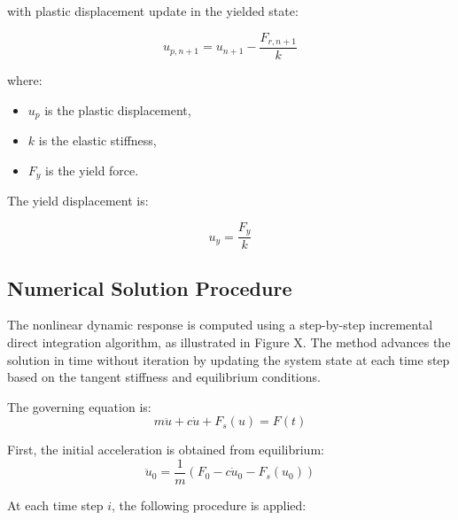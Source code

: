 with plastic displacement update in the yielded state:

\begin{equation}
u_{p,n+1} = u_{n+1} - \frac{F_{r,n+1}}{k}
\end{equation}

where:
\begin{itemize}
\item $u_p$ is the plastic displacement,
\item $k$ is the elastic stiffness,
\item $F_y$ is the yield force.
\end{itemize}

The yield displacement is:

\begin{equation}
u_y = \frac{F_y}{k}
\end{equation}



\subsection{Numerical Solution Procedure}

The nonlinear dynamic response is computed using a step-by-step incremental
direct integration algorithm, as illustrated in Figure X. The method advances
the solution in time without iteration by updating the system state at each
time step based on the tangent stiffness and equilibrium conditions.

The governing equation is:
\begin{equation}
m \ddot{u} + c \dot{u} + F_s(u) = F(t)
\end{equation}

First, the initial acceleration is obtained from equilibrium:
\begin{equation}
\ddot{u}_0 = \frac{1}{m}\left(F_0 - c\dot{u}_0 - F_s(u_0)\right)
\end{equation}

At each time step $i$, the following procedure is applied:

